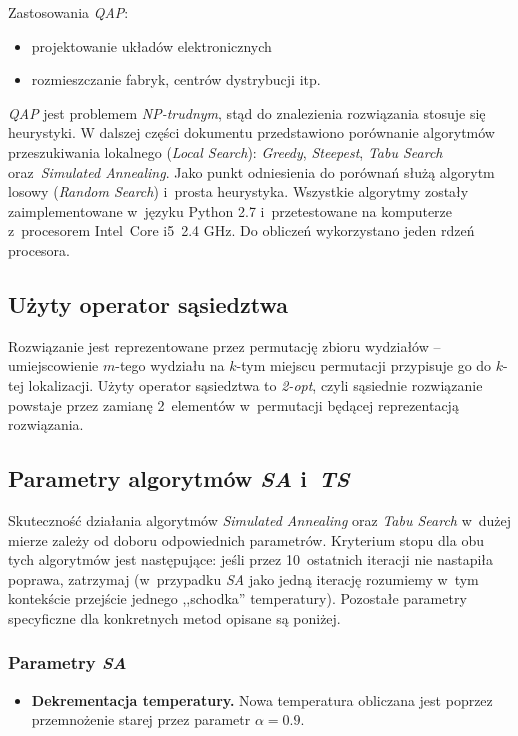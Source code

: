 \documentclass{article}
\begin{document}
	Zastosowania \emph{QAP}:
	\begin{itemize}
		\item{projektowanie układów elektronicznych}
		\item{rozmieszczanie fabryk, centrów dystrybucji itp.}
	\end{itemize}
	
	\emph{QAP} jest problemem \emph{NP-trudnym}, stąd do znalezienia rozwiązania stosuje się heurystyki. W dalszej części dokumentu przedstawiono porównanie algorytmów przeszukiwania lokalnego (\emph{Local Search}): \emph{Greedy},  \emph{Steepest}, \emph{Tabu Search} oraz~\emph{Simulated Annealing}. Jako punkt odniesienia do porównań służą algorytm losowy (\emph{Random Search}) i~prosta heurystyka. Wszystkie algorytmy zostały zaimplementowane w~języku Python 2.7 i~przetestowane na komputerze z~procesorem Intel~Core i5~2.4 GHz. Do obliczeń wykorzystano jeden rdzeń procesora.

	\subsection{Użyty operator sąsiedztwa\label{ss:operator}}
	Rozwiązanie jest reprezentowane przez permutację zbioru wydziałów -- umiejscowienie $m$-tego wydziału na $k$-tym miejscu permutacji przypisuje go do $k$-tej lokalizacji.
	Użyty operator sąsiedztwa to \emph{2-opt}, czyli sąsiednie rozwiązanie powstaje przez zamianę 2~elementów w~permutacji będącej reprezentacją rozwiązania.

	\subsection{Parametry algorytmów \emph{SA} i~\emph{TS}}
	Skuteczność działania algorytmów \emph{Simulated Annealing} oraz \emph{Tabu Search} w~dużej mierze zależy od doboru odpowiednich parametrów. Kryterium stopu dla obu tych algorytmów jest następujące: jeśli przez 10~ostatnich iteracji nie nastapiła poprawa, zatrzymaj (w~przypadku \emph{SA} jako jedną iterację rozumiemy w~tym kontekście przejście jednego ,,schodka'' temperatury). Pozostałe parametry specyficzne dla konkretnych metod opisane są poniżej.
		\subsubsection{Parametry \emph{SA}}
			\begin{itemize}
			\item{\textbf{Dekrementacja temperatury.} Nowa temperatura obliczana jest poprzez przemnożenie starej przez parametr $\alpha=0.9$.}
			\end{itemize}
\end{document}
